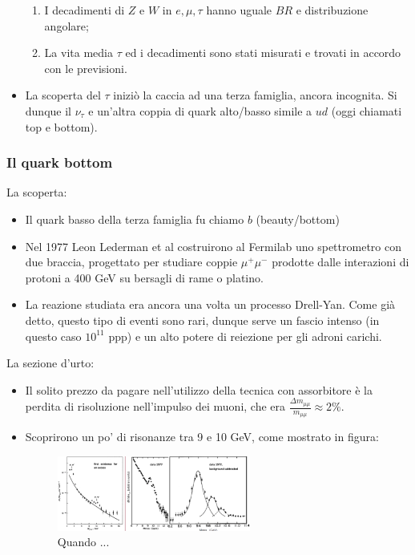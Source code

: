 \begin{itemize}
    \begin{enumerate}
        \item I decadimenti di $Z$ e $W$ in $e,\mu,\tau$ hanno uguale $BR$ e distribuzione angolare;
        \item La vita media $\tau$ ed i decadimenti sono stati misurati e trovati in accordo con le previsioni.
    \end{enumerate}
    \item La scoperta del $\tau$ iniziò la caccia ad una terza famiglia, ancora incognita. Si dunque il $\nu_\tau$ e un'altra coppia di quark alto/basso simile a $ud$ (oggi chiamati top e bottom).
\end{itemize}
\subsubsection{Il quark bottom}
La scoperta:
\begin{itemize}
    \item Il quark basso della terza famiglia fu chiamo $b$ (beauty/bottom)
    \item Nel 1977 Leon Lederman et al costruirono al Fermilab uno spettrometro con due braccia, progettato per studiare coppie $\mu^+\mu^-$ prodotte dalle interazioni di protoni a 400 GeV su bersagli di rame o platino.
    \item La reazione studiata era ancora una volta un processo Drell-Yan. Come già detto, questo tipo di eventi sono rari, dunque serve un fascio intenso (in questo caso $10^{11}$ ppp) e un alto potere di reiezione per gli adroni carichi.
\end{itemize}
La sezione d'urto:
\begin{itemize}
    \item Il solito prezzo da pagare nell'utilizzo della tecnica con assorbitore è la perdita di risoluzione nell'impulso dei muoni, che era $\frac{\Delta m_{\mu\mu}}{m_{\mu\mu}}\approx2\%$.
    \item Scoprirono un po' di risonanze tra 9 e 10 GeV, come mostrato in figura:
    \begin{figure}[H]
        \centering
        \includegraphics[width=0.6\textwidth]{immagini/fig_b_discovery.png}
        \caption{Quando ...}
    \end{figure}
\end{itemize}